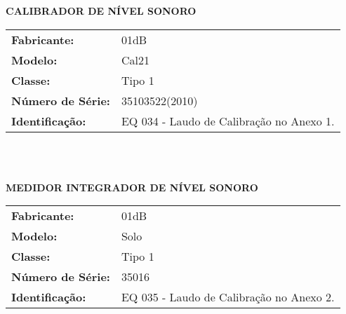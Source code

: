 \begin{SingleSpace}
\textbf{CALIBRADOR DE NÍVEL SONORO} \\

\begin{minipage}{5cm}
\begin{tabular}{ll}
	\textbf{Fabricante:}      & 01dB                                     \\
	\textbf{Modelo:}          & Cal21                                    \\
	\textbf{Classe:}          & Tipo 1                                   \\
	\textbf{Número de Série:} & 35103522(2010)                           \\
	\textbf{Identificação:}   & EQ 034 - Laudo de Calibração no Anexo 1.
\end{tabular}
\end{minipage} \\

\

\textbf{MEDIDOR INTEGRADOR DE NÍVEL SONORO} \\

\begin{minipage}{5cm}
\begin{tabular}{ll}
	\textbf{Fabricante:}      & 01dB                                     \\
	\textbf{Modelo:}          & Solo                                     \\
	\textbf{Classe:}          & Tipo 1                                   \\
	\textbf{Número de Série:} & 35016                                    \\
	\textbf{Identificação:}   & EQ 035 - Laudo de Calibração no Anexo 2.
\end{tabular}
\end{minipage}
\end{SingleSpace}

